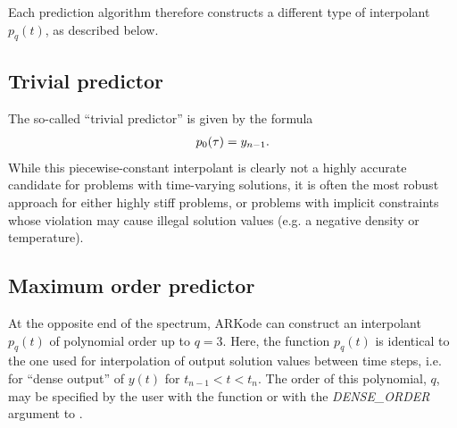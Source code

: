 \documentclass[letterpaper,10pt,english]{sphinxmanual}
\begin{document}
Each prediction algorithm therefore constructs a different type of
interpolant $p_q(t)$, as described below.


\subsection{Trivial predictor}
\label{Mathematics:trivial-predictor}\label{Mathematics:mathematics-predictors-trivial}
The so-called ``trivial predictor'' is given by the formula
\begin{gather}
\begin{split}p_0(\tau) = y_{n-1}.\end{split}\notag
\end{gather}
While this piecewise-constant interpolant is clearly not a highly
accurate candidate for problems with time-varying solutions, it is
often the most robust approach for either highly stiff problems, or
problems with implicit constraints whose violation may cause illegal
solution values (e.g. a negative density or temperature).


\subsection{Maximum order predictor}
\label{Mathematics:maximum-order-predictor}\label{Mathematics:mathematics-predictors-max}
At the opposite end of the spectrum, ARKode can construct an
interpolant $p_q(t)$ of polynomial order up to $q=3$.
Here, the function $p_q(t)$ is identical to the one used for
interpolation of output solution values between time steps, i.e. for
``dense output'' of $y(t)$ for $t_{n-1} < t < t_n$.
The order of this polynomial, $q$, may be specified by the user
with the function {\hyperref[c_interface/User_callable:ARKodeSetDenseOrder]{}} or with the
\emph{DENSE\_ORDER} argument to {\hyperref[f_interface/Usage:f/_/FARKSETIIN]{}}.
\end{document}
